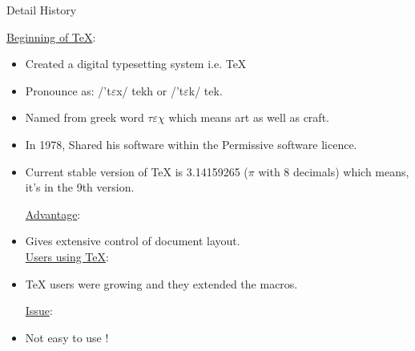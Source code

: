 \documentclass[11pt]{beamer}
\begin{document}
\begin{frame}{Detail History}

\underline{\color{brown} Beginning of \TeX}:
\begin{itemize}

\item Created a digital typesetting system i.e. \TeX

\item {\color{orange}Pronounce} as: /'t$\varepsilon$x/ tekh or {\color{violet}/'t$\varepsilon$k/ tek}.

\item Named from greek word $\tau \varepsilon \chi$ which means art as well as craft.
\item In 1978, Shared his software within the Permissive software licence.
\item Current stable version of \TeX\hspace{0.01cm} is 3.14159265 ($\pi$ with 8 decimals) which means, it's in the 9th version. 

\pause

\underline{\color{brown} Advantage}:
\item Gives extensive control of document layout.\\

\underline{\color{brown} Users using \TeX}:
\item \TeX\hspace{0.01cm} users were growing and they extended the macros.

\pause
\vspace{0.2cm}
\underline{\color{brown}Issue}:\\
\item Not easy to use ! 

\end{itemize}
\end{frame}

\end{document}
